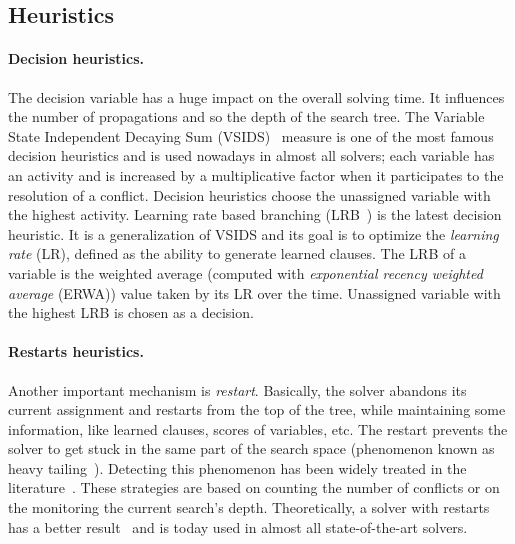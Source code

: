  
 
\subsection{Heuristics}\label{sec:heuristics}

\paragraph{Decision heuristics.}
 The decision variable has a huge impact on the 
overall solving time. It influences the number of propagations and so 
the depth of the search tree.
 The Variable State Independent Decaying Sum (VSIDS)~\cite{moskewicz2001chaff} measure is one of the most famous decision heuristics and is used
nowadays in almost all solvers; each variable has an activity and  is increased by a multiplicative factor 
when it participates to the resolution of a conflict.
Decision heuristics choose the unassigned variable with the highest activity.
Learning rate based branching (LRB~\cite{liang2016learning}) is the latest decision heuristic. It is a
generalization of VSIDS and its goal is to optimize the \emph{learning rate} (LR), defined as the ability to generate
learned clauses. The LRB of a variable is the weighted average (computed with \emph{exponential recency
weighted average} (ERWA))  value taken by its LR over the time. Unassigned variable with the highest LRB is chosen as a decision. 

\paragraph{Restarts heuristics.}
Another important mechanism is \emph{restart}. Basically, the solver abandons its current assignment and 
restarts from the top of the tree, while maintaining some information, like learned clauses, scores of variables, etc.
 The restart prevents the solver to get stuck in the same part of the search space (phenomenon known as heavy tailing~\cite{gomes1997heavy}).
Detecting this phenomenon has been widely treated in the literature~\cite{audemard2012refining,biere2008adaptive}.
These strategies are based on counting the number of conflicts or on the monitoring the current search’s depth.
Theoretically, a solver with restarts has a better result~\cite{huang2007effect} and is today
used in almost all state-of-the-art solvers.


